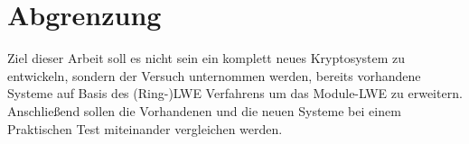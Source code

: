 \chapter{Abgrenzung}
\label{Abgrenzung}

Ziel dieser Arbeit soll es nicht sein ein komplett neues Kryptosystem zu entwickeln, sondern der Versuch unternommen werden, bereits vorhandene Systeme auf Basis des (Ring-)LWE Verfahrens um das Module-LWE zu erweitern. Anschließend sollen die Vorhandenen und die neuen Systeme bei einem Praktischen Test miteinander vergleichen werden.